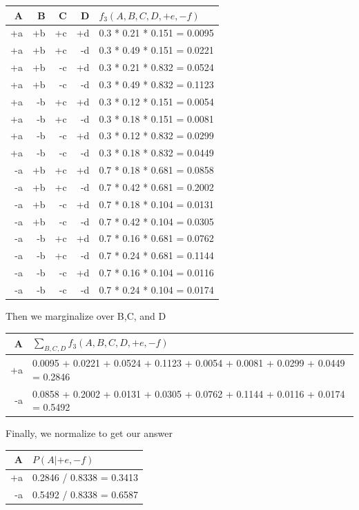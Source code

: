 \documentclass[12pt]{article}
\begin{document}
\begin{center}
\begin{tabular}{|r|r|r|r|l|} \hline
A  & B  & C  & D  & $f_3(A,B,C,D,+e,-f)$  \\ \hline
+a & +b & +c & +d & 0.3 * 0.21 * 0.151 = 0.0095\\ \hline
+a & +b & +c & -d & 0.3 * 0.49 * 0.151 = 0.0221\\ \hline
+a & +b & -c & +d & 0.3 * 0.21 * 0.832 = 0.0524\\ \hline
+a & +b & -c & -d & 0.3 * 0.49 * 0.832 = 0.1123\\ \hline
+a & -b & +c & +d & 0.3 * 0.12 * 0.151 = 0.0054\\ \hline
+a & -b & +c & -d & 0.3 * 0.18 * 0.151 = 0.0081\\ \hline
+a & -b & -c & +d & 0.3 * 0.12 * 0.832 = 0.0299\\ \hline
+a & -b & -c & -d & 0.3 * 0.18 * 0.832 = 0.0449\\ \hline
-a & +b & +c & +d & 0.7 * 0.18 * 0.681 = 0.0858\\ \hline
-a & +b & +c & -d & 0.7 * 0.42 * 0.681 = 0.2002\\ \hline
-a & +b & -c & +d & 0.7 * 0.18 * 0.104 = 0.0131\\ \hline
-a & +b & -c & -d & 0.7 * 0.42 * 0.104 = 0.0305\\ \hline
-a & -b & +c & +d & 0.7 * 0.16 * 0.681 = 0.0762\\ \hline
-a & -b & +c & -d & 0.7 * 0.24 * 0.681 = 0.1144\\ \hline
-a & -b & -c & +d & 0.7 * 0.16 * 0.104 = 0.0116\\ \hline
-a & -b & -c & -d & 0.7 * 0.24 * 0.104 = 0.0174\\ \hline
\end{tabular}
\end{center}
Then we marginalize over B,C, and D 
\begin{center}
\begin{tabular}{|r|l|} \hline
A  & $\sum_{B,C,D}f_3(A,B,C,D, +e,-f)$ \\ \hline
+a & 0.0095 + 0.0221 + 0.0524 + 0.1123 + 0.0054 + 0.0081 + 0.0299 + 0.0449 = 0.2846 \\ \hline
-a & 0.0858 + 0.2002 + 0.0131 + 0.0305 + 0.0762 + 0.1144 + 0.0116 + 0.0174 = 0.5492\\ \hline
\end{tabular}
\end{center}
Finally, we normalize to get our answer
\begin{center}
\begin{tabular}{|r|l|} \hline
A  & $P(A| +e,-f)$ \\ \hline
+a & 0.2846 / 0.8338 = 0.3413
 \\ \hline
-a & 0.5492 / 0.8338 = 0.6587\\ \hline
\end{tabular}
\end{center}

\end{document}
